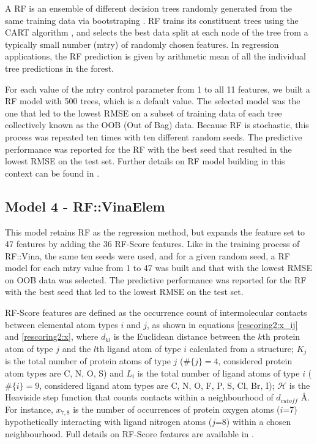 \documentclass[twocolumn]{bmcart}
\begin{document}
A RF is an ensemble of different decision trees randomly generated from the same training data via bootstraping \cite{1309}. RF trains its constituent trees using the CART algorithm \cite{1310}, and selects the best data split at each node of the tree from a typically small number (mtry) of randomly chosen features. In regression applications, the RF prediction is given by arithmetic mean of all the individual tree predictions in the forest.

For each value of the mtry control parameter from 1 to all 11 features, we built a RF model with 500 trees, which is a default value. The selected model was the one that led to the lowest RMSE on a subset of training data of each tree collectively known as the OOB (Out of Bag) data. Because RF is stochastic, this process was repeated ten times with ten different random seeds. The predictive performance was reported for the RF with the best seed that resulted in the lowest RMSE on the test set. Further details on RF model building in this context can be found in \cite{1647}.

\subsection*{Model 4 - RF::VinaElem}

This model retains RF as the regression method, but expands the feature set to 47 features by adding the 36 RF-Score \cite{564} features. Like in the training process of RF::Vina, the same ten seeds were used, and for a given random seed, a RF model for each mtry value from 1 to 47 was built and that with the lowest RMSE on OOB data was selected. The predictive performance was reported for the RF with the best seed that led to the lowest RMSE on the test set.

RF-Score features are defined as the occurrence count of intermolecular contacts between elemental atom types $i$ and $j$, as shown in equations \ref{rescoring2:x_ij} and \ref{rescoring2:x}, where $d_{kl}$ is the Euclidean distance between the $k$th protein atom of type $j$ and the $l$th ligand atom of type $i$ calculated from a structure; $K_j$ is the total number of protein atoms of type $j$ ($\#\{j\}=4$, considered protein atom types are C, N, O, S) and $L_i$ is the total number of ligand atoms of type $i$ ($\#\{i\}=9$, considered ligand atom types are C, N, O, F, P, S, Cl, Br, I); $\mathcal{H}$ is the Heaviside step function that counts contacts within a neighbourhood of $d_{cutoff}$ \AA. For instance, $x_{7,8}$ is the number of occurrences of protein oxygen atoms ($i$=7) hypothetically interacting with ligand nitrogen atoms ($j$=8) within a chosen neighbourhood. Full details on RF-Score features are available in \cite{564,1295}.
\end{document}
